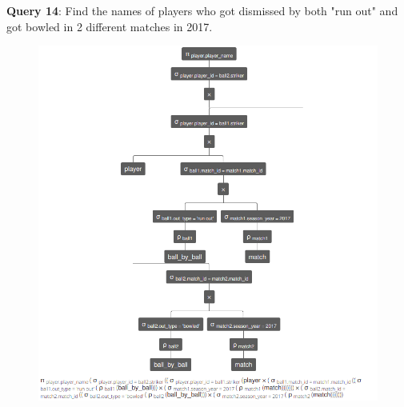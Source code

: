 \documentclass[12pt, fleqn]{article}
\begin{document}
\newpage
\textbf{Query 14}: Find the names of players who got dismissed by both "run out" and got bowled in 2 different matches in 2017. \\
\begin{figure}[H]
  \centering
  \includegraphics[scale=0.6]{ra/ra14.png}
\end{figure}
\end{document}
